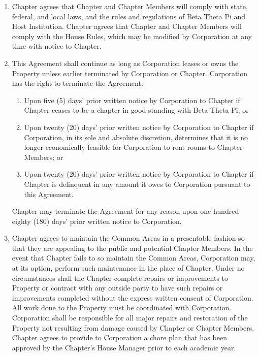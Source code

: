 \documentclass[12pt]{article}
\begin{document}
\begin{enumerate}
        \item Chapter agrees that Chapter and Chapter Members will comply with state, federal, and local laws, and the rules and regulations of Beta Theta Pi and Host Institution.
                Chapter agrees that Chapter and Chapter Members will comply with the House Rules, which may be modified by Corporation at any time with notice to Chapter.

        \item This Agreement shall continue as long as Corporation leases or owns the Property unless earlier terminated by Corporation or Chapter. Corporation has the right to terminate the Agreement:

                \begin{enumerate}[label=\alph*.]
                        \item Upon five (5) days' prior written notice by Corporation to Chapter if Chapter ceases to be a chapter in good standing with Beta Theta Pi; or

                        \item Upon twenty (20) days' prior written notice by Corporation to Chapter if Corporation, in its sole and absolute discretion, determines that it is no longer economically feasible for Corporation to rent rooms to Chapter Members; or

                        \item Upon twenty (20) days' prior written notice by Corporation to Chapter if Chapter is delinquent in any amount it owes to Corporation pursuant to this Agreement.
                \end{enumerate}

        Chapter may terminate the Agreement for any reason upon one hundred eighty (180) days' prior written notice to Corporation.

        \item Chapter agrees to maintain the Common Areas in a presentable fashion so that they are appealing to the public and potential Chapter Members.
                In the event that Chapter fails to so maintain the Common Areas, Corporation may, at its option, perform such maintenance in the place of Chapter.
                Under no circumstances shall the Chapter complete repairs or improvements to Property or contract with any outside party to have such repairs or improvements completed without the express written consent of Corporation.
                All work done to the Property must be coordinated with Corporation.
                Corporation shall be responsible for all major repairs and restoration of the Property not resulting from damage caused by Chapter or Chapter Members.
                Chapter agrees to provide to Corporation a chore plan that has been approved by the Chapter's House Manager prior to each academic year.


\end{enumerate}
\end{document}
